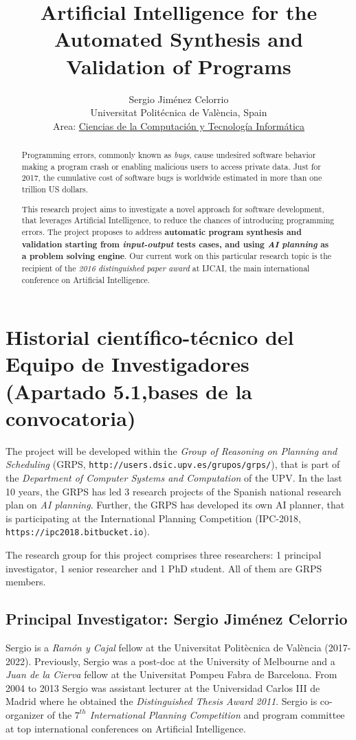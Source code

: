 \documentclass[10pt,a4paper]{paper}
\title{Artificial Intelligence for the Automated Synthesis and Validation of Programs}
\author{Sergio Jim\'enez Celorrio\\
\footnotesize Universitat Politécnica de València, Spain\\
\small Area: \underline{Ciencias de la Computación y Tecnología Informática}}
\begin{document}
\maketitle

\begin{abstract}
Programming errors, commonly known as {\em bugs}, cause undesired software behavior making a program crash or enabling malicious users to access private data. Just for 2017, the cumulative cost of software bugs is worldwide estimated in more than one trillion US dollars. 

This research project aims to investigate a novel approach for software development, that leverages Artificial Intelligence, to reduce the chances of introducing programming errors. The project proposes to address {\bf automatic program synthesis and validation starting from {\em input-output} tests cases, and using {\em AI planning} as a problem solving engine}. Our current work on this particular research topic is the recipient of the {\em 2016 distinguished paper award} at {\sc IJCAI}, the main international conference on Artificial Intelligence.
\end{abstract}

\newpage

\section{Historial científico-técnico del Equipo de Investigadores (Apartado 5.1,bases de la convocatoria)}

The project will be developed within the {\em Group of Reasoning on Planning and Scheduling} (GRPS, {\tt http://users.dsic.upv.es/grupos/grps/}), that is part of the {\em Department of Computer Systems and Computation} of the UPV. In the last 10 years, the GRPS has led 3 research projects of the Spanish national research plan on {\em AI planning}. Further, the GRPS has developed its own AI planner, that is participating  at the International Planning Competition (IPC-2018, {\tt https://ipc2018.bitbucket.io}).

The research group for this project comprises three researchers: 1 principal investigator, 1 senior researcher and 1 PhD student. All of them are GRPS members. 

\subsection{Principal Investigator: Sergio Jiménez Celorrio}
Sergio is a {\em Ramón y Cajal} fellow at the Universitat Politècnica de València (2017-2022). Previously, Sergio was a post-doc at the University of Melbourne and a {\em Juan de la Cierva} fellow at the Universitat Pompeu Fabra de Barcelona. From 2004 to 2013 Sergio was assistant lecturer at the Universidad Carlos III de Madrid where he obtained the {\em Distinguished Thesis Award 2011}. Sergio is co-organizer of the {\em $7^{th}$ International Planning Competition} and program committee at top international conferences on Artificial Intelligence.
\end{document}
